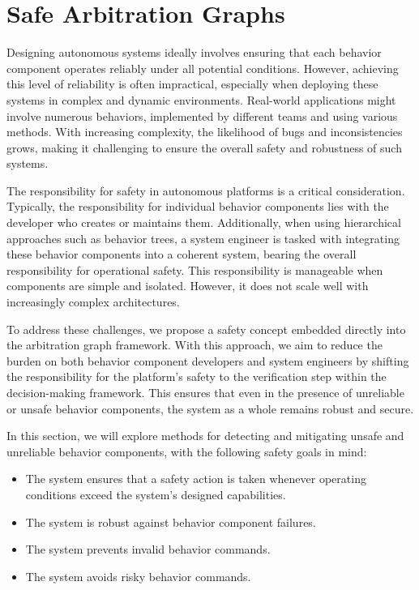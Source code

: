 \section{Safe Arbitration Graphs}

Designing autonomous systems ideally involves ensuring that each behavior component operates reliably under all potential conditions.
However, achieving this level of reliability is often impractical, especially when deploying these systems in complex and dynamic environments.
Real-world applications might involve numerous behaviors, implemented by different teams and using various methods.
With increasing complexity, the likelihood of bugs and inconsistencies grows, making it challenging to ensure the overall safety and robustness of such systems.

The responsibility for safety in autonomous platforms is a critical consideration.
Typically, the responsibility for individual behavior components lies with the developer who creates or maintains them.
Additionally, when using hierarchical approaches such as behavior trees,
    a system engineer is tasked with integrating these behavior components into a coherent system,
    bearing the overall responsibility for operational safety.
This responsibility is manageable when components are simple and isolated.
However, it does not scale well with increasingly complex architectures.

To address these challenges, we propose a safety concept embedded directly into the arbitration graph framework.
With this approach, we aim to reduce the burden on both behavior component developers and system engineers
by shifting the responsibility for the platform's safety to the verification step within the decision-making framework.
This ensures that even in the presence of unreliable or unsafe behavior components, the system as a whole remains robust and secure.

In this section, we will explore methods for detecting and mitigating unsafe and unreliable behavior components, with the following safety goals in mind:

\begin{itemize}
    \item The system ensures that a safety action is taken whenever operating conditions exceed the system's designed capabilities.
    \item The system is robust against behavior component failures.
    \item The system prevents invalid behavior commands.
    \item The system avoids risky behavior commands.
\end{itemize}

